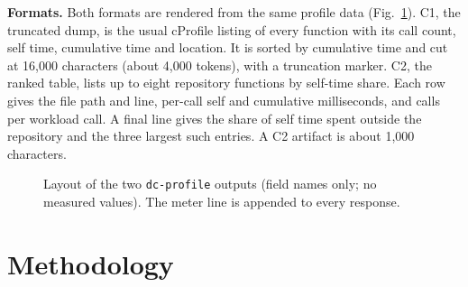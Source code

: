 \documentclass[conference]{IEEEtran}
\newcommand{\tool}{\texttt{dc-profile}}
\begin{document}
\textbf{Formats.} Both formats are rendered from the same profile data
(Fig.~\ref{fig:formats}). C1, the truncated dump, is the usual cProfile
listing of every function with its call count, self time, cumulative time and
location. It is sorted by cumulative time and cut at 16{,}000 characters
(about 4{,}000 tokens), with a truncation marker. C2, the ranked table, lists
up to eight repository functions by self-time share. Each row gives the file
path and line, per-call self and cumulative milliseconds, and calls per
workload call. A final line gives the share of self time spent outside the
repository and the three largest such entries. A C2 artifact is about
1{,}000 characters.

\begin{figure}[t]
\centering
\footnotesize
{}
\caption{Layout of the two \tool{} outputs (field names only; no measured
values). The meter line is appended to every response.}
\label{fig:formats}
\end{figure}

\section{Methodology}
\label{sec:method}
\end{document}
